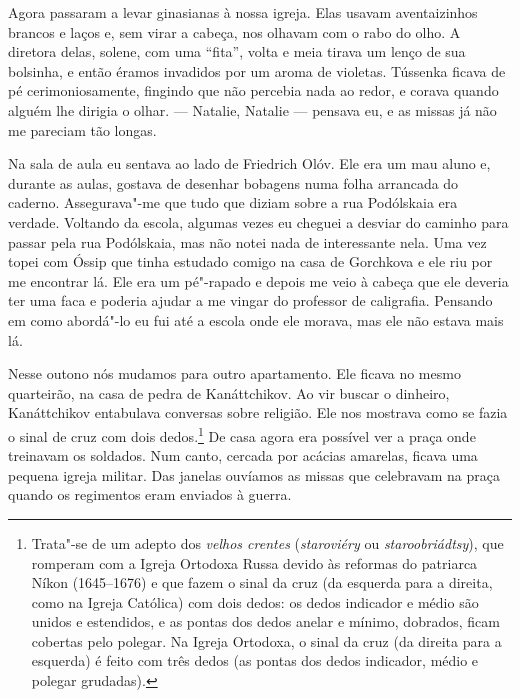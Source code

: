 Agora passaram a levar ginasianas à nossa igreja. Elas usavam
aventaizinhos brancos e laços e, sem virar a cabeça, nos olhavam com o
rabo do olho. A diretora delas, solene, com uma ``fita'', volta e meia
tirava um lenço de sua bolsinha, e então éramos invadidos por um aroma
de violetas. Tússenka ficava de pé cerimoniosamente, fingindo que não
percebia nada ao redor, e corava quando alguém lhe dirigia o olhar. ---
Natalie, Natalie --- pensava eu, e as missas já não me pareciam tão
longas.

Na sala de aula eu sentava ao lado de Friedrich Olóv. Ele era um mau
aluno e, durante as aulas, gostava de desenhar bobagens numa folha
arrancada do caderno. Assegurava"-me que tudo que diziam sobre a rua
Podólskaia era verdade. Voltando da escola, algumas vezes eu cheguei a
desviar do caminho para passar pela rua Podólskaia, mas não notei nada
de interessante nela. Uma vez topei com Óssip que tinha estudado comigo
na casa de Gorchkova e ele riu por me encontrar lá. Ele era um pé"-rapado
e depois me veio à cabeça que ele deveria ter uma faca e poderia ajudar
a me vingar do professor de caligrafia. Pensando em como abordá"-lo eu
fui até a escola onde ele morava, mas ele não estava mais lá.

Nesse outono nós mudamos para outro apartamento. Ele ficava no mesmo
quarteirão, na casa de pedra de Kanáttchikov. Ao vir buscar o dinheiro,
Kanáttchikov entabulava conversas sobre religião. Ele nos mostrava como
se fazia o sinal de cruz com dois dedos.\footnote{Trata"-se de um adepto
  dos \emph{velhos crentes} (\emph{staroviéry} ou
  \emph{staroobriádtsy}), que romperam com a Igreja Ortodoxa Russa
  devido às reformas do patriarca Níkon (1645--1676) e que fazem
  o sinal da cruz (da esquerda para a direita, como na Igreja Católica)
  com dois dedos: os dedos indicador e médio são unidos e estendidos, e
  as pontas dos dedos anelar e mínimo, dobrados, ficam cobertas pelo
  polegar. Na Igreja Ortodoxa, o sinal da cruz (da direita para a
  esquerda) é feito com três dedos (as pontas dos dedos indicador, médio
  e polegar grudadas).} De casa agora era possível ver a praça onde
treinavam os soldados. Num canto, cercada por acácias amarelas, ficava
uma pequena igreja militar. Das janelas ouvíamos as missas que
celebravam na praça quando os regimentos eram enviados à guerra.

